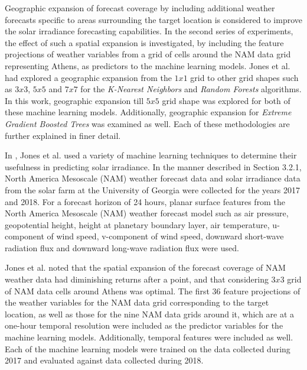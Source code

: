 \par Geographic expansion of forecast coverage by including additional weather forecasts specific to areas surrounding the target location is considered to improve the solar irradiance forecasting capabilities. In the second series of experiments, the effect of such a spatial expansion is investigated, by including the feature projections of weather variables from a grid of cells around the NAM data grid representing Athens, as predictors to the machine learning models. Jones et al. had explored a geographic expansion from the $1 x 1$ grid to other grid shapes such as $3 x 3$, $5 x 5$ and $7 x 7$ for the \textit{K-Nearest Neighbors} and \textit{Random Forests} algorithms. In this work, geographic expansion till $5 x 5$ grid shape was explored for both of these machine learning models. Additionally, geographic expansion for \textit{Extreme Gradient Boosted Trees} was examined as well. Each of these methodologies are further explained in finer detail.

\par In \cite{thesis_zach}, Jones et al. used a variety of machine learning techniques to determine their usefulness in predicting solar irradiance. In the manner described in Section 3.2.1, North America Mesoscale (NAM) weather forecast data and solar irradiance data from the solar farm at the University of Georgia were collected for the years 2017 and 2018. For a forecast horizon of 24 hours, planar surface features from the North America Mesoscale (NAM) weather forecast model such as air pressure, geopotential height, height at planetary boundary layer, air temperature, u-component of wind speed, v-component of wind speed, downward short-wave radiation flux and downward long-wave radiation flux were used. 

\par Jones et al. noted that the spatial expansion of the forecast coverage of NAM weather data had diminishing returns after a point, and that considering $3 x 3$ grid of NAM data cells around Athens was optimal. The first 36 feature projections of the weather variables for the NAM data grid corresponding to the target location, as well as those for the nine NAM data grids around it, which are at a one-hour temporal resolution were included as the predictor variables for the machine learning models. Additionally, temporal features were included as well. Each of the machine learning models were trained on the data collected during 2017 and evaluated against data collected during 2018.

